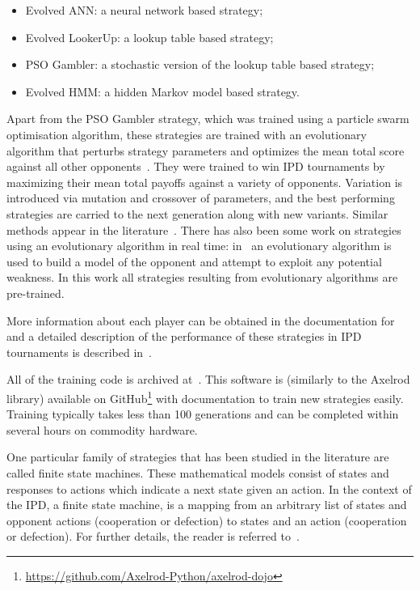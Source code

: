 \documentclass[10pt,letterpaper]{article}
\begin{document}
\begin{itemize}
    \item Evolved ANN: a neural network based strategy;
    \item Evolved LookerUp: a lookup table based strategy;
    \item PSO Gambler: a stochastic version of the lookup table based strategy;
    \item Evolved HMM: a hidden Markov model based strategy.
\end{itemize}

Apart from the PSO Gambler strategy, which was trained using a particle swarm
optimisation algorithm, these strategies are trained with an evolutionary
algorithm that perturbs strategy parameters and optimizes the mean total score
against all other opponents~\cite{affenzeller2009genetic}. They were trained to
win IPD tournaments by maximizing their mean total payoffs against a variety
of opponents. Variation is
introduced via mutation and crossover of parameters, and the best performing
strategies are carried to the next generation along with new variants. Similar
methods appear in the literature~\cite{Ashlock2006}.
There has also been some work on strategies using an evolutionary algorithm in real time:
in~\cite{Gaudesi2016}
an evolutionary algorithm is used to build a model of the opponent and attempt
to exploit any potential weakness. In this work all strategies resulting from
evolutionary algorithms are pre-trained.

More information about each player can be obtained in the documentation for
\cite{axelrodproject} and a detailed description of the performance
of these strategies in IPD tournaments is described in~\cite{Harper2017}.

All of the training code is archived at~\cite{marc_harper_2017_824264}. This
software is (similarly to the Axelrod library) available on
GitHub\footnote{\url{https://github.com/Axelrod-Python/axelrod-dojo}}
with documentation to
train new strategies easily. Training
typically takes less than 100 generations and can be completed within several
hours on commodity hardware.

One particular family of strategies that has been studied in the literature are
called finite state machines. These mathematical models consist of states
and responses to actions which indicate a next state given an action. In the
context of the IPD, a finite state machine, is a mapping from an arbitrary list
of states and opponent actions (cooperation or defection) to states and an
action (cooperation or defection). For further details,
the reader is referred to~\cite{Ashlock2006, AshlockBook, Ashlock2007, Harper2017}.
\end{document}
